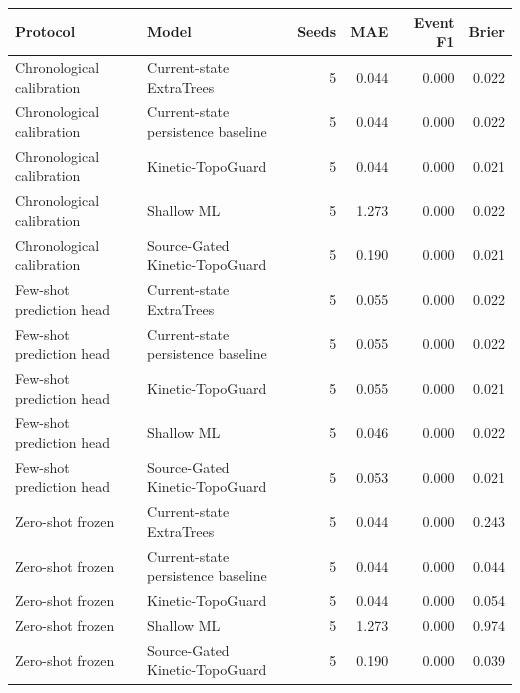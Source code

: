 \begin{tabular}{llrrrr}
\toprule
Protocol & Model & Seeds & MAE & Event F1 & Brier \\
\midrule
Chronological calibration & Current-state ExtraTrees & 5 & 0.044 & 0.000 & 0.022 \\
Chronological calibration & Current-state persistence baseline & 5 & 0.044 & 0.000 & 0.022 \\
Chronological calibration & Kinetic-TopoGuard & 5 & 0.044 & 0.000 & 0.021 \\
Chronological calibration & Shallow ML & 5 & 1.273 & 0.000 & 0.022 \\
Chronological calibration & Source-Gated Kinetic-TopoGuard & 5 & 0.190 & 0.000 & 0.021 \\
Few-shot prediction head & Current-state ExtraTrees & 5 & 0.055 & 0.000 & 0.022 \\
Few-shot prediction head & Current-state persistence baseline & 5 & 0.055 & 0.000 & 0.022 \\
Few-shot prediction head & Kinetic-TopoGuard & 5 & 0.055 & 0.000 & 0.021 \\
Few-shot prediction head & Shallow ML & 5 & 0.046 & 0.000 & 0.022 \\
Few-shot prediction head & Source-Gated Kinetic-TopoGuard & 5 & 0.053 & 0.000 & 0.021 \\
Zero-shot frozen & Current-state ExtraTrees & 5 & 0.044 & 0.000 & 0.243 \\
Zero-shot frozen & Current-state persistence baseline & 5 & 0.044 & 0.000 & 0.044 \\
Zero-shot frozen & Kinetic-TopoGuard & 5 & 0.044 & 0.000 & 0.054 \\
Zero-shot frozen & Shallow ML & 5 & 1.273 & 0.000 & 0.974 \\
Zero-shot frozen & Source-Gated Kinetic-TopoGuard & 5 & 0.190 & 0.000 & 0.039 \\
\bottomrule
\end{tabular}
